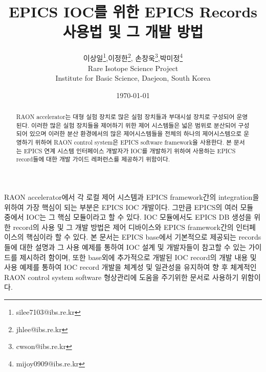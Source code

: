 \documentclass[11pt
  , a4paper
  , article
  , oneside
]{memoir}
\begin{document}
\newcommand{\technumber}{
  RAON Control-Document Series\\
  Revision : v1.0,   Release : 2014-12-24 fixed date}
\title{\textbf{EPICS IOC를 위한 EPICS Records 사용법 및 그 개발 방법}}

\author{이상일\thanks{silee7103@ibs.re.kr},이정한\thanks{jhlee@ibs.re.kr}, 손창욱\thanks{cwson@ibs.re.kr},박미정\thanks{mijoy0909@ibs.re.kr} \\

  Rare Isotope Science Project\\
  Institute for Basic Science, Daejeon, South Korea
}
\date{\today}

\renewcommand{\maketitlehooka}{\begin{flushright}\textsf{\technumber}\end{flushright}}

\maketitle

\begin{abstract}
RAON accelerator는 대형 실험 장치로 많은 실험 장치들과 부대시설 장치로 구성되어 운영된다. 이러한 많은 실험 장치들을 제어하기 위한 제어 시스템들은 넓은 범위로 분산되어 구성되어 있으며 이러한 분산 환경에서의 많은 제어시스템들을 전체의 하나의 제어시스템으로 운영하기 위하여 RAON control system은 EPICS software framework을 사용한다. 본 문서는 EPICS 연계 시스템 인터페이스 개발자가 IOC를 개발하기 위하여 사용하는 EPICS record들에 대한 개발 가이드 레퍼런스를 제공하기 위함이다.
\end{abstract}

RAON accelerator에서 각 로컬 제어 시스템과 EPICS framework간의 integration을 위하여 가장 핵심이 되는 부분은 EPICS IOC 개발이다. 그만큼 EPICS의 여러 모듈 중에서 IOC는 그 핵심 모듈이라고 할 수 있다. IOC 모듈에서도 EPICS DB 생성을 위한 record의 사용 및 그 개발 방법은 제어 디바이스와 EPICS framework간의 인터페이스의 핵심이라 할 수 있다. 본 문서는 EPICS base에서 기본적으로 제공되는 records들에 대한 설명과 그 사용 예제를 통하여 IOC 설계 및 개발자들이 참고할 수 있는 가이드를 제시하려 함이며, 또한 base외에 추가적으로 개발된 IOC record의 개발 내용 및 사용 예제를 통하여 IOC record 개발을 체계성 및 일관성을 유지하여 향 후 체계적인 RAON control system software 형상관리에 도움을 주기위한 문서로 사용하기 위함이다.
\end{document}

